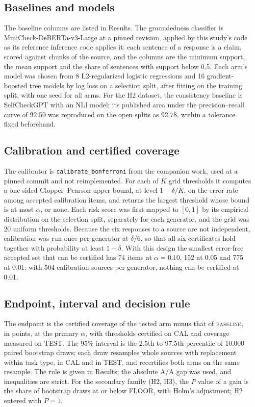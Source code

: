 \documentclass[11pt]{article}
\newcommand{\arm}[1]{\textsc{#1}}
\begin{document}
\subsection*{Baselines and models}
The baseline columns are listed in Results. The groundedness classifier is MiniCheck-DeBERTa-v3-Large\cite{minicheck} at a pinned revision, applied by this study's code as its reference inference code applies it: each sentence of a response is a claim, scored against chunks of the source, and the columns are the minimum support, the mean support and the share of sentences with support below 0.5. Each arm's model was chosen from 8 L2-regularized logistic regressions and 16 gradient-boosted tree models by log loss on a selection split, after fitting on the training split, with one seed for all arms. For the H2 dataset, the consistency baseline is SelfCheckGPT with an NLI model\cite{selfcheck}; its published area under the precision--recall curve of 92.50 was reproduced on the open splits as 92.78, within a tolerance fixed beforehand.

\subsection*{Calibration and certified coverage}
The calibrator is \texttt{calibrate\_bonferroni} from the companion work\cite{mcelveen}, used at a pinned commit and not reimplemented. For each of $K$ grid thresholds it computes a one-sided Clopper--Pearson\cite{clopper} upper bound, at level $1-\delta/K$, on the error rate among accepted calibration items, and returns the largest threshold whose bound is at most $\alpha$, or none. Each risk score was first mapped to $[0,1]$ by its empirical distribution on the selection split, separately for each generator, and the grid was 20 uniform thresholds. Because the six responses to a source are not independent, calibration was run once per generator at $\delta/6$, so that all six certificates hold together with probability at least $1-\delta$. With this design the smallest error-free accepted set that can be certified has 74 items at $\alpha = 0.10$, 152 at 0.05 and 775 at 0.01; with 504 calibration sources per generator, nothing can be certified at 0.01.

\subsection*{Endpoint, interval and decision rule}
The endpoint is the certified coverage of the tested arm minus that of \arm{baseline}, in points, at the primary $\alpha$, with thresholds certified on CAL and coverage measured on TEST. The 95\% interval is the 2.5th to 97.5th percentile of 10,000 paired bootstrap draws; each draw resamples whole sources with replacement within task type, in CAL and in TEST, and recertifies both arms on the same resample. The rule is given in Results; the absolute A/A gap was used, and inequalities are strict. For the secondary family (H2, H3), the $P$ value of a gain is the share of bootstrap draws at or below FLOOR, with Holm's adjustment\cite{holm}; H2 entered with $P = 1$.
\end{document}
